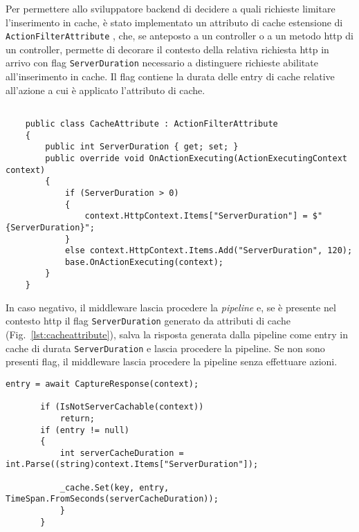 Per permettere allo sviluppatore backend di decidere a quali richieste limitare l'inserimento in cache, è stato implementato un attributo di cache estensione di \\ \verb|ActionFilterAttribute| \cite{ACTIONFILTER}, che, se anteposto a un controller o a un metodo http di un controller, permette di decorare il contesto della relativa richiesta http \cite{HTTPCONTEXT} in arrivo con flag \verb|ServerDuration| necessario a distinguere richieste abilitate all'inserimento in cache.
Il flag contiene la durata delle entry di cache relative all'azione a cui è applicato l'attributo di cache.

\begin{lstlisting}[caption={CacheAttribute.cs}, style=javaScriptCode, label={lst:cacheattribute}]

    public class CacheAttribute : ActionFilterAttribute
    {
        public int ServerDuration { get; set; }
        public override void OnActionExecuting(ActionExecutingContext context)
        {
            if (ServerDuration > 0)
            {
                context.HttpContext.Items["ServerDuration"] = $"{ServerDuration}";
            }
            else context.HttpContext.Items.Add("ServerDuration", 120);
            base.OnActionExecuting(context);
        }
    }
\end{lstlisting}

In caso negativo, il middleware lascia procedere la \textit{pipeline} e, se è presente nel contesto http \cite{HTTPCONTEXT} il flag \verb|ServerDuration| generato da attributi di cache \cite{ACTIONFILTER} (Fig.~\ref{lst:cacheattribute}), salva la risposta generata dalla pipeline come entry in cache di durata \verb|ServerDuration| e lascia procedere la pipeline. Se non sono presenti flag, il middleware lascia procedere la pipeline senza effettuare azioni.

\begin{lstlisting}[caption={TotallyOriginalCachingMiddleware.cs, Cache miss scenario}, style=javaScriptCode]
entry = await CaptureResponse(context);

       if (IsNotServerCachable(context))
           return;
       if (entry != null)
       {
           int serverCacheDuration = int.Parse((string)context.Items["ServerDuration"]);

           _cache.Set(key, entry, TimeSpan.FromSeconds(serverCacheDuration));
           }
       }
\end{lstlisting}
